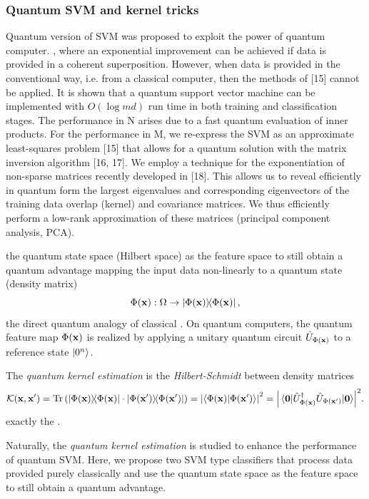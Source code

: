 \subsubsection{Quantum SVM and kernel tricks}
Quantum version of SVM was proposed \cite{rebentrostQuantumSupportVector2014} to exploit the power of quantum computer.
, where an exponential improvement can be achieved if data is provided in a coherent superposition. However, when data is provided in the conventional way, i.e. from a classical computer, then the methods of [15] cannot be applied. \cite{tangQuantuminspiredClassicalAlgorithm2019}
It is shown that a quantum support vector machine can be implemented with $O(\log md)$ run time in both training and classiﬁcation stages. 
The performance in N arises due to a fast quantum evaluation of inner products.
For the performance in M, we re-express the SVM as an approximate least-squares problem [15] that allows for a quantum solution with the matrix inversion algorithm [16, 17]. We employ a technique for the exponentiation of non-sparse matrices recently developed in [18]. This allows us to reveal efﬁciently in quantum form the largest eigenvalues and corresponding eigenvectors of the training data overlap (kernel) and covariance matrices. We thus efficiently perform a low-rank approximation of these matrices (principal component analysis, PCA).
\begin{definition}\label{def:quantum_feature_map}
	the quantum state space (Hilbert space) as the feature space to still obtain a quantum advantage
	mapping the input data non-linearly to a quantum state (density matrix) 
	\begin{equation}
		\Phi(\vbx): \Omega \to \dyad{\Phi(\vbx)},
		\label{eq:quantum_feature_map}
	\end{equation}
	the direct quantum analogy of classical .
	On quantum computers, the quantum feature map $\Phi(\vb{x})$ is realized by applying a unitary quantum circuit $\hat{U}_{\Phi(\vb{x})}$ to a reference state $\ket{0^n}$.
\end{definition}
\begin{definition}\label{def:quantum_kernel}
	The \emph{quantum kernel estimation} is the \emph{Hilbert-Schmidt}  between density matrices
	\begin{equation}
		\kernel(\vbx,\vbx') 
		= \Tr\qty(\dyad{\Phi(\vbx)}\cdot \dyad{\Phi(\vbx')})
		= \abs{\braket{\Phi(\vbx)}{\Phi(\vbx')}}^2 = 
		\abs{\matrixel{\vb{0}}{\U^\dagger_{\Phi(\vbx)} \U_{\Phi(\vbx')}}{\vb{0}}}^2.
	\end{equation}
	exactly the .
\end{definition}
Naturally, the \emph{quantum kernel estimation}
\cite{schuldQuantumMachineLearning2019}
\cite{havlicekSupervisedLearningQuantum2019} 
is studied to enhance the performance of quantum SVM.
Here, we propose two SVM type classifiers that process data provided purely classically and use the quantum state space as the feature space to still obtain a quantum advantage.


